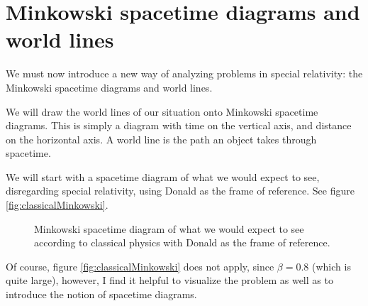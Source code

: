 \section{Minkowski spacetime diagrams and world lines}
	We must now introduce a new way of analyzing problems in special relativity: the Minkowski spacetime diagrams and world lines.

	We will draw the world lines of our situation onto Minkowski spacetime diagrams.
	This is simply a diagram with time on the vertical axis, and distance on the horizontal axis.
	A world line is the path an object takes through spacetime.

	We will start with a spacetime diagram of what we would expect to see, disregarding special relativity, using Donald as the frame of reference. See figure \vref{fig:classicalMinkowski}.
	\begin{figure}[H]
		\begin{minipage}{0.3\textwidth}
			\caption{Minkowski spacetime diagram of what we would expect to see according to classical physics with Donald as the frame of reference.}
			\label{fig:classicalMinkowski}
		\end{minipage}
		\hfill
		\begin{minipage}{0.6\textwidth}
		\end{minipage}
	\end{figure}
	Of course, figure \vref{fig:classicalMinkowski} does not apply, since $\beta = 0.8$ (which is quite large), however, I find it helpful to visualize the problem as well as to introduce the notion of spacetime diagrams.
